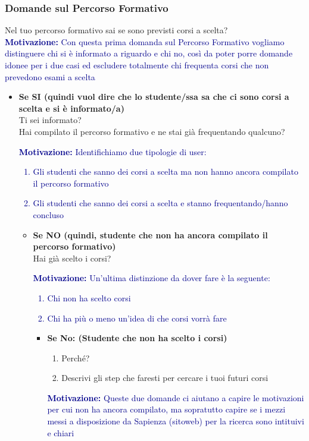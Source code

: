 \subsubsection{Domande sul Percorso Formativo}
Nel tuo percorso formativo sai se sono previsti corsi a scelta?\\
\textcolor{darkblue}{\textbf{Motivazione:} Con questa prima domanda sul Percorso Formativo vogliamo distinguere chi si è informato a riguardo e chi no, 
così da poter porre domande idonee per i due casi ed escludere totalmente chi frequenta corsi che non prevedono esami a scelta}
\begin{itemize}
    \item \textbf{Se SI (quindi vuol dire che lo studente/ssa  sa che ci sono corsi a scelta e si è informato/a)}\\
    Ti sei informato?\\
    Hai compilato il percorso formativo e ne stai già frequentando qualcuno?\\
    \textcolor{darkblue}{\textbf{Motivazione:} Identifichiamo due tipologie di user:
    \begin{enumerate}
        \item Gli studenti che sanno dei corsi a scelta ma non hanno ancora compilato il percorso formativo
        \item Gli studenti che sanno dei corsi a scelta e stanno frequentando/hanno concluso
    \end{enumerate}}
    \begin{itemize}
        \item \textbf{Se NO (quindi, studente che non ha ancora compilato il percorso formativo)}\\
        Hai già scelto i corsi?\\
        \textcolor{darkblue}{\textbf{Motivazione:} Un'ultima distinzione da dover fare è la seguente:
        \begin{enumerate}
            \item Chi non ha scelto corsi
            \item Chi ha più o meno un'idea di che corsi vorrà fare
        \end{enumerate}}
        
        \begin{itemize}
            \item \textbf{Se No: (Studente che non ha scelto i corsi)}
            \begin{enumerate}
                \item Perché?
                \item Descrivi gli step che faresti per cercare i tuoi futuri corsi
            \end{enumerate}
            \textcolor{darkblue}{\textbf{Motivazione:} Queste due domande ci aiutano a capire le motivazioni per cui non ha ancora compilato, ma sopratutto capire se i mezzi
            messi a disposizione da Sapienza (sitoweb) per la ricerca sono intituivi e chiari}


\end{itemize}
\end{itemize}
\end{itemize}
